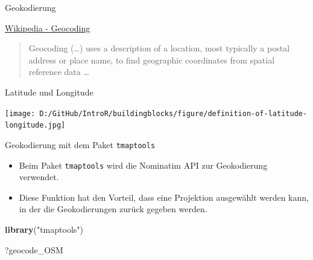 \documentclass[ignorenonframetext,]{beamer}
\newenvironment{Shaded}{\begin{snugshade}}{\end{snugshade}}
\newcommand{\KeywordTok}[1]{\textcolor[rgb]{0.26,0.66,0.93}{\textbf{#1}}}
\newcommand{\NormalTok}[1]{\textcolor[rgb]{0.74,0.68,0.62}{#1}}
\newcommand{\StringTok}[1]{\textcolor[rgb]{0.02,0.61,0.04}{#1}}
\providecommand{\tightlist}{%
  \setlength{\itemsep}{0pt}\setlength{\parskip}{0pt}}
\begin{document}
\begin{frame}{Geokodierung}
\protect\hypertarget{geokodierung-1}{}

\begin{block}{\href{https://github.com/adam-p/markdown-here/wiki/Markdown-Cheatsheet\#blockquotes}{Wikipedia
- Geocoding}}

\begin{quote}
Geocoding (\ldots{}) uses a description of a location, most typically a
postal address or place name, to find geographic coordinates from
spatial reference data \ldots{}
\end{quote}

\end{block}

\end{frame}

\begin{frame}{Latitude und Longitude}
\protect\hypertarget{latitude-und-longitude}{}

\texttt{[image: D:/GitHub/IntroR/buildingblocks/figure/definition-of-latitude-longitude.jpg]}

\end{frame}

\begin{frame}[fragile]{Geokodierung mit dem Paket \texttt{tmaptools}}
\protect\hypertarget{geokodierung-mit-dem-paket-tmaptools}{}

\begin{itemize}
\tightlist
\item
  Beim Paket \texttt{tmaptools} wird die Nominatim API zur Geokodierung
  verwendet.
\item
  Diese Funktion hat den Vorteil, dass eine Projektion ausgewählt werden
  kann, in der die Geokodierungen zurück gegeben werden.
\end{itemize}

\begin{Shaded}
\begin{Highlighting}[]
\KeywordTok{library}\NormalTok{(}\StringTok{"tmaptools"}\NormalTok{)}
\end{Highlighting}
\end{Shaded}

\begin{Shaded}
\begin{Highlighting}[]
\NormalTok{?geocode_OSM}
\end{Highlighting}
\end{Shaded}

\end{frame}
\end{document}
